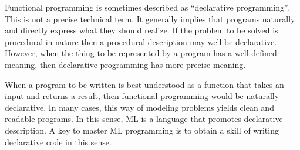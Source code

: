 \documentclass{jbook}
\newcommand{\txt}[2]{#2}
\begin{document}
\txt
{
	時折，関数型プログラミングは「宣言的」であると言われます．
	この言葉は厳密な技術的用語ではなく，プログラムが実現したいことそ
のものの記述するといった意味の曖昧性のある言葉です．
	しかし，これから書こうとするプログラムが表現すべきものがあらかじ
め理解されている場合，宣言的な記述は，より明確な意味を持ちます．
	
	書こうとするプログラムが入力を受け取り出力を返す関数と理解できる
場合，そのプログラムを，入力と出力の関係を表す関数として直接表現できれば，
より宣言的記述となり，したがってより分かりやすく簡潔なプログラムとなるは
ずです．
	MLは，この意味でより宣言的な記述を可能にするプログラミング言語と
いえます．
	MLプログラミングをマスターする鍵の一つは，この意味での宣言的プロ
グラミングの考え方を身につけることです．
}
{
	Functional programming is sometimes described as ``declarative
programming''.
	This is not a precise technical term.
	It generally implies that programs naturally and directly
express what they should realize.
	If the problem to be solved is procedural in nature then a
procedural description may well be declarative.
	However, when the thing to be represented by a program has a
well defined meaning, then declarative programming has more precise
meaning.
	
	When a program to be written is best understood as a function
that takes an input and returns a result, then functional programming
would be naturally declarative.
	In many cases, this way of modeling problems yields 
clean and readable programs.
	In this sense, ML is a language that promotes declarative
description.
	A key to master ML programming is to obtain a skill of writing
declarative code in this sense.
}
\end{document}
